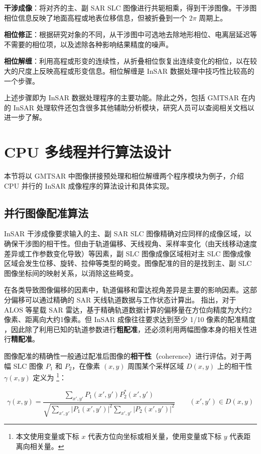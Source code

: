 \textbf{干涉成像}：将对齐的主、副 SAR SLC 图像进行共轭相乘，得到干涉图像。干涉图相位信息反映了地面高程或地表位移信息，但被折叠到一个 $2\pi$ 周期上。

\textbf{相位修正}：根据研究对象的不同，从干涉图中可选地去除地形相位、电离层延迟等不需要的相位项，以及滤除各种影响结果精度的噪声。

\textbf{相位解缠}：利用高程或形变的连续性，从折叠相位恢复出连续变化的相位，以在较大的尺度上反映高程或形变信息。相位解缠是 InSAR 数据处理中技巧性比较高的一个步骤。

上述步骤即为 InSAR 数据处理程序的主要功能。除此之外，包括 GMTSAR 在内的 InSAR 处理软件还包含很多其他辅助分析模块，研究人员可以查阅相关文档以进一步了解。


\section{CPU 多线程并行算法设计}

本节将以 GMTSAR 中图像拼接预处理和相位解缠两个程序模块为例子，介绍 CPU 并行的 InSAR 成像程序的算法设计和具体实现。

\subsection{并行图像配准算法}

InSAR 干涉成像要求输入的主、副 SAR SLC 图像精确对应同样的成像区域，以确保干涉图的相干性。但由于轨道偏移、天线视角、采样率变化（由天线移动速度差异或工作参数变化导致）等因素，副 SLC 图像成像区域相对主 SLC 图像成像区域会发生位移、旋转、拉伸等类型的畸变。图像配准的目的是找到主、副 SLC 图像坐标间的映射关系，以消除这些畸变。

在各类导致图像偏移的因素中，轨道偏移和雷达视角差异是主要的影响因素。这部分偏移可以通过精确的 SAR 天线轨道数据与工作状态计算出。\citet{sandwell2011gmtsar} 指出，对于 ALOS 等星载 SAR 雷达，基于精确轨道数据计算的偏移量在方位向精度为大约2像素、距离向大约1像素。但 InSAR 成像往往要求达到至少 1/10 像素的配准精度 \cite{li2008image}，因此除了利用已知的轨道参数进行\textbf{粗配准}，还必须利用两幅图像本身的相关性进行\textbf{精配准}。

图像配准的精确性一般通过配准后图像的\textbf{相干性}（coherence）进行评估。对于两幅 SLC 图像 $P_1$ 和 $P_2$，在像素 $(x, y)$ 周围某个采样区域 $D(x, y)$ 上的相干性 $\gamma(x, y)$ 定义为 \footnote{本文使用变量或下标 $x$ 代表方位向坐标或相关量，使用变量或下标 $y$ 代表距离向相关量。}：

\begin{equation}
    \gamma(x, y) = \frac{\sum_{x', y'} P_1(x', y') P_2^*(x', y')}{\sqrt{\sum_{x', y'}|P_1(x', y')|^2 \sum_{x', y'}|P_2(x', y')|^2}} \qquad (x', y') \in D(x, y)
    \label{eq:coherence}
\end{equation}

